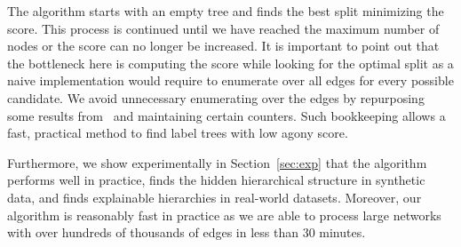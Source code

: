 The algorithm starts with an empty tree and finds the best split minimizing the
score. This process is continued until we have reached the maximum number of
nodes or the score can no longer be increased. It is important to point out
that the bottleneck here is computing the score while looking for the optimal
split as a naive implementation would require to enumerate over all edges for
every possible candidate.  We avoid unnecessary  enumerating over the edges by
repurposing some results from~\citet{nikolaj2017tiers} and maintaining certain
counters.  Such bookkeeping allows a fast, practical method to find label trees
with low agony score.

Furthermore, we show experimentally in Section~\ref{sec:exp} that the algorithm performs well in
practice, finds the hidden hierarchical structure in synthetic data, and
finds explainable hierarchies in real-world datasets.
Moreover, our algorithm is reasonably fast in practice as we are able to
process large networks with over hundreds of thousands of edges in less than 30 minutes.